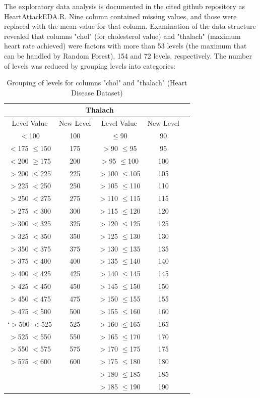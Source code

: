 The exploratory data analysis is documented in the cited github repository as HeartAttackEDA.R.\newline
Nine column contained missing values, and those were replaced with the mean value for that column. Examination of the data structure revealed that columns "chol" (for cholesterol value) and "thalach" (maximum heart rate achieved) were factors with more than 53 levels (the maximum that can be handled by Random Forest), 154 and 72 levels, respectively. The number of levels was reduced by grouping levels into categories:
\begin{table}[!htbp]
\centering
\begin{tabular}{*5c}
  \hline
  \rowcolor{LightCyan}
  \multicolumn{2}{c}{Cholesterol} & \multicolumn{2}{c}{Thalach} \\
  \hline
  \hline
Level Value & New Level & Level Value & New Level\\ 
  \hline
    $<$100  & 100 & $\leq$90 & 90 \\ 
   $<$175 $\leq$150 & 175 & $>$90 $\leq$95   &  95 \\ 
  $<$200 $\geq$175 & 200 & $>$95 $\leq$100  & 100  \\ 
   $>$200 $\leq$225 & 225 & $>$100 $\leq$105 & 105  \\ 
   $>$225 $<$250  & 250 & $>$105 $\leq$110 & 110  \\ 
   $>$250 $<$275  & 275 & $>$110 $\leq$115 & 115  \\ 
   $>$275 $<$300  & 300 & $>$115 $\leq$120 & 120   \\ 
   $>$300 $<$325  & 325 & $>$120 $\leq$125 & 125   \\ 
   $>$325 $<$350  & 350 & $>$125 $\leq$130 & 130  \\ 
   $>$350 $<$375  & 375 & $>$130 $\leq$135 & 135  \\ 
   $>$375 $<$400  & 400 & $>$135 $\leq$140 & 140 \\ 
   $>$400 $<$425  & 425 & $>$140 $\leq$145 & 145\\ 
   $>$425 $<$450  & 450 & $>$145 $\leq$150 & 150\\ 
   $>$450 $<$475  & 475 & $>$150 $\leq$155 & 155\\ 
   $>$475 $<$500  & 500 & $>$155 $\leq$160 & 160\\ 
  `$>$500 $<$525  & 525 & $>$160 $\leq$165 & 165 \\ 
   $>$525 $<$550  & 550 & $>$165 $\leq$170 & 170 \\ 
   $>$550 $<$575  & 575 & $>$170 $\leq$175 & 175 \\ 
   $>$575 $<$600  & 600 & $>$175 $\leq$180 & 180 \\ 
                  &     & $>$180 $\leq$185 & 185 \\ 
                  &     & $>$185 $\leq$190 & 190 \\ 
   \hline
\end{tabular}
\caption{Grouping of levels for columns "chol" and "thalach" (Heart Disease Dataset)}
\end{table}

